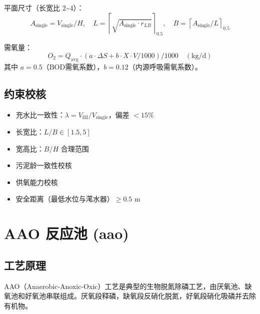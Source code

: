 \documentclass[12pt,a4paper]{ctexart}
\begin{document}
平面尺寸（长宽比 2\textasciitilde4）：
\begin{equation}
A_{\text{single}} = V_{\text{single}} / H, \quad
L = \left\lceil \sqrt{A_{\text{single}} \cdot r_{LB}} \right\rceil_{0.5}, \quad
B = \left\lceil A_{\text{single}} / L \right\rceil_{0.5}
\end{equation}

需氧量：
\begin{equation}
O_2 = Q_{\text{avg}} \cdot (a \cdot \Delta S + b \cdot X \cdot V / 1000) / 1000 \quad (\text{kg/d})
\end{equation}
其中 $a = 0.5$（BOD需氧系数），$b = 0.12$（内源呼吸需氧系数）。

\subsection{约束校核}
\begin{itemize}
  \item 充水比一致性：$\lambda = V_{\text{fill}} / V_{\text{single}}$，偏差 $< 15\%$
  \item 长宽比：$L/B \in [1.5, 5]$
  \item 宽高比：$B/H$ 合理范围
  \item 污泥龄一致性校核
  \item 供氧能力校核
  \item 安全距离（最低水位与滗水器）$\ge 0.5$ m
\end{itemize}

\section{AAO 反应池 (aao)}

\subsection{工艺原理}
AAO（Anaerobic-Anoxic-Oxic）工艺是典型的生物脱氮除磷工艺，由厌氧池、缺氧池和好氧池串联组成。厌氧段释磷，缺氧段反硝化脱氮，好氧段硝化吸磷并去除有机物。
\end{document}
